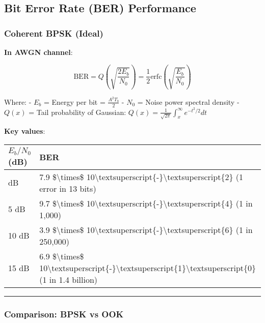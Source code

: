 \subsection{Bit Error Rate (BER)
Performance}\label{bit-error-rate-ber-performance}

\subsubsection{Coherent BPSK (Ideal)}\label{coherent-bpsk-ideal}

\textbf{In AWGN channel}:

\[
\text{BER} = Q\left(\sqrt{\frac{2E_b}{N_0}}\right) = \frac{1}{2}\text{erfc}\left(\sqrt{\frac{E_b}{N_0}}\right)
\]

Where: - \(E_b\) = Energy per bit = \(\frac{A^2 T_b}{2}\) - \(N_0\) =
Noise power spectral density - \(Q(x)\) = Tail probability of Gaussian:
\(Q(x) = \frac{1}{\sqrt{2\pi}}\int_x^\infty e^{-t^2/2}dt\)

\textbf{Key values}:

{\def\LTcaptype{} %
\begin{longtable}[]{@{}ll@{}}
\toprule\noalign{}
\(E_b/N_0\) (dB) & BER \\
\midrule\noalign{}
\endhead
\bottomrule\noalign{}
\endlastfoot
0 dB & 7.9 \$\textbackslash times\$
10\textbackslash textsuperscript\{-\}\textbackslash textsuperscript\{2\}
(1 error in 13 bits) \\
5 dB & 9.7 \$\textbackslash times\$
10\textbackslash textsuperscript\{-\}\textbackslash textsuperscript\{4\}
(1 in 1,000) \\
10 dB & 3.9 \$\textbackslash times\$
10\textbackslash textsuperscript\{-\}\textbackslash textsuperscript\{6\}
(1 in 250,000) \\
15 dB & 6.9 \$\textbackslash times\$
10\textbackslash textsuperscript\{-\}\textbackslash textsuperscript\{1\}\textbackslash textsuperscript\{0\}
(1 in 1.4 billion) \\
\end{longtable}
}

\begin{center}\rule{0.5\linewidth}{0.5pt}\end{center}

\subsubsection{Comparison: BPSK vs OOK}\label{comparison-bpsk-vs-ook}

